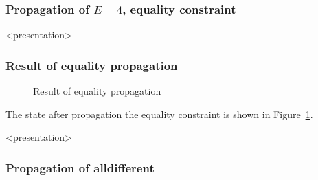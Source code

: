 \begin{frame}
\frametitle{Propagation of $E=4$, equality constraint}
\end{frame}

\begin{frame}<presentation>
\frametitle{Result of equality propagation}
\begin{center}

\end{center}
\end{frame}

\begin{figure}[ht]
\caption{\label{sendmore:equality1}Result of equality propagation}
\begin{center}

\end{center}
\end{figure}

The state after propagation the equality constraint is shown in Figure~\ref{sendmore:equality1}.

\begin{frame}<presentation>
\frametitle{Propagation of alldifferent}
\begin{center}
\end{center}
\end{frame}

